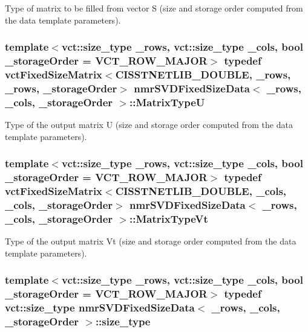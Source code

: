 Type of matrix to be filled from vector S (size and storage order computed from the data template parameters). \hypertarget{classnmr_s_v_d_fixed_size_data_a164bbc8eccf8b1102d5a85dde45de99d}{
\subsubsection[{Matrix\-Type\-U}]{\setlength{\rightskip}{0pt plus 5cm}template$<$vct\-::size\-\_\-type \-\_\-rows, vct\-::size\-\_\-type \-\_\-cols, bool \-\_\-storage\-Order = V\-C\-T\-\_\-\-R\-O\-W\-\_\-\-M\-A\-J\-O\-R$>$ typedef {\bf vct\-Fixed\-Size\-Matrix}$<$C\-I\-S\-S\-T\-N\-E\-T\-L\-I\-B\-\_\-\-D\-O\-U\-B\-L\-E, \-\_\-rows, \-\_\-rows, \-\_\-storage\-Order$>$ {\bf nmr\-S\-V\-D\-Fixed\-Size\-Data}$<$ \-\_\-rows, \-\_\-cols, \-\_\-storage\-Order $>$\-::{\bf Matrix\-Type\-U}}}\label{classnmr_s_v_d_fixed_size_data_a164bbc8eccf8b1102d5a85dde45de99d}
Type of the output matrix U (size and storage order computed from the data template parameters). \hypertarget{classnmr_s_v_d_fixed_size_data_ab9a7c396f7a83256d5e8c789b3a23591}{
\subsubsection[{Matrix\-Type\-Vt}]{\setlength{\rightskip}{0pt plus 5cm}template$<$vct\-::size\-\_\-type \-\_\-rows, vct\-::size\-\_\-type \-\_\-cols, bool \-\_\-storage\-Order = V\-C\-T\-\_\-\-R\-O\-W\-\_\-\-M\-A\-J\-O\-R$>$ typedef {\bf vct\-Fixed\-Size\-Matrix}$<$C\-I\-S\-S\-T\-N\-E\-T\-L\-I\-B\-\_\-\-D\-O\-U\-B\-L\-E, \-\_\-cols, \-\_\-cols, \-\_\-storage\-Order$>$ {\bf nmr\-S\-V\-D\-Fixed\-Size\-Data}$<$ \-\_\-rows, \-\_\-cols, \-\_\-storage\-Order $>$\-::{\bf Matrix\-Type\-Vt}}}\label{classnmr_s_v_d_fixed_size_data_ab9a7c396f7a83256d5e8c789b3a23591}
Type of the output matrix Vt (size and storage order computed from the data template parameters). \hypertarget{classnmr_s_v_d_fixed_size_data_a2622c8b24534929513816ff92ac83216}{
\subsubsection[{size\-\_\-type}]{\setlength{\rightskip}{0pt plus 5cm}template$<$vct\-::size\-\_\-type \-\_\-rows, vct\-::size\-\_\-type \-\_\-cols, bool \-\_\-storage\-Order = V\-C\-T\-\_\-\-R\-O\-W\-\_\-\-M\-A\-J\-O\-R$>$ typedef {\bf vct\-::size\-\_\-type} {\bf nmr\-S\-V\-D\-Fixed\-Size\-Data}$<$ \-\_\-rows, \-\_\-cols, \-\_\-storage\-Order $>$\-::{\bf size\-\_\-type}}}\label{classnmr_s_v_d_fixed_size_data_a2622c8b24534929513816ff92ac83216}
